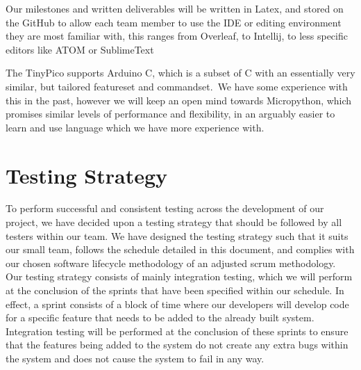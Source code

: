             Our milestones and written deliverables will be written in Latex, and stored on the GitHub to allow each
            team member to use the IDE or editing environment they are most familiar with, this ranges from Overleaf, to
            Intellij, to less specific editors like ATOM or SublimeText

            The TinyPico supports Arduino C, which is a subset of C with an essentially very similar, but tailored
            featureset and commandset.\ We have some experience with this in the past, however we will keep an open mind
            towards Micropython, which promises similar levels of performance and flexibility, in an arguably easier to
            learn and use language which we have more experience with.

    \section{Testing Strategy}

        To perform successful and consistent testing across the development of our project, we have decided upon a testing strategy that should be followed by all testers within our team. We have designed the testing strategy such that it suits our small team, follows the schedule detailed in this document, and complies with our chosen software lifecycle methodology of an adjusted scrum methodology. Our testing strategy consists of mainly integration testing, which we will perform at the conclusion of the sprints that have been specified within our schedule. In effect, a sprint consists of a block of time where our developers will develop code for a specific feature that needs to be added to the already built system. Integration testing will be performed at the conclusion of these sprints to ensure that the features being added to the system do not create any extra bugs within the system and does not cause the system to fail in any way.

